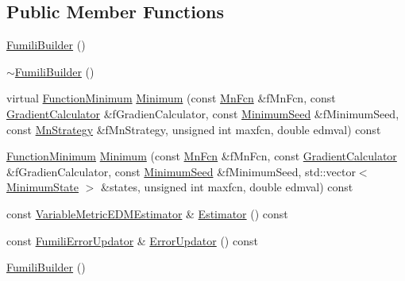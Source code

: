 \subsection*{Public Member Functions}
\begin{DoxyCompactItemize}
\item 
\mbox{\hyperlink{classROOT_1_1Minuit2_1_1FumiliBuilder_a79c7807308c680ea2e42829171ebe8c1}{Fumili\+Builder}} ()
\item 
\mbox{\hyperlink{classROOT_1_1Minuit2_1_1FumiliBuilder_a1de07586a1617732f49d59df92c44006}{$\sim$\+Fumili\+Builder}} ()
\item 
virtual \mbox{\hyperlink{classROOT_1_1Minuit2_1_1FunctionMinimum}{Function\+Minimum}} \mbox{\hyperlink{classROOT_1_1Minuit2_1_1FumiliBuilder_a6e598ea8d57750ec860595ba494bb501}{Minimum}} (const \mbox{\hyperlink{classROOT_1_1Minuit2_1_1MnFcn}{Mn\+Fcn}} \&f\+Mn\+Fcn, const \mbox{\hyperlink{classROOT_1_1Minuit2_1_1GradientCalculator}{Gradient\+Calculator}} \&f\+Gradien\+Calculator, const \mbox{\hyperlink{classROOT_1_1Minuit2_1_1MinimumSeed}{Minimum\+Seed}} \&f\+Minimum\+Seed, const \mbox{\hyperlink{classROOT_1_1Minuit2_1_1MnStrategy}{Mn\+Strategy}} \&f\+Mn\+Strategy, unsigned int maxfcn, double edmval) const
\item 
\mbox{\hyperlink{classROOT_1_1Minuit2_1_1FunctionMinimum}{Function\+Minimum}} \mbox{\hyperlink{classROOT_1_1Minuit2_1_1FumiliBuilder_ac0df0ebc275b75e6a6831f102f1753d2}{Minimum}} (const \mbox{\hyperlink{classROOT_1_1Minuit2_1_1MnFcn}{Mn\+Fcn}} \&f\+Mn\+Fcn, const \mbox{\hyperlink{classROOT_1_1Minuit2_1_1GradientCalculator}{Gradient\+Calculator}} \&f\+Gradien\+Calculator, const \mbox{\hyperlink{classROOT_1_1Minuit2_1_1MinimumSeed}{Minimum\+Seed}} \&f\+Minimum\+Seed, std\+::vector$<$ \mbox{\hyperlink{classROOT_1_1Minuit2_1_1MinimumState}{Minimum\+State}} $>$ \&states, unsigned int maxfcn, double edmval) const
\item 
const \mbox{\hyperlink{classROOT_1_1Minuit2_1_1VariableMetricEDMEstimator}{Variable\+Metric\+E\+D\+M\+Estimator}} \& \mbox{\hyperlink{classROOT_1_1Minuit2_1_1FumiliBuilder_a1e7bd763cd6677dd08d528079143d7b2}{Estimator}} () const
\item 
const \mbox{\hyperlink{classROOT_1_1Minuit2_1_1FumiliErrorUpdator}{Fumili\+Error\+Updator}} \& \mbox{\hyperlink{classROOT_1_1Minuit2_1_1FumiliBuilder_a03face0b120b333aea0b49d5531518ef}{Error\+Updator}} () const
\item 
\mbox{\hyperlink{classROOT_1_1Minuit2_1_1FumiliBuilder_a79c7807308c680ea2e42829171ebe8c1}{Fumili\+Builder}} ()

\end{DoxyCompactItemize}
